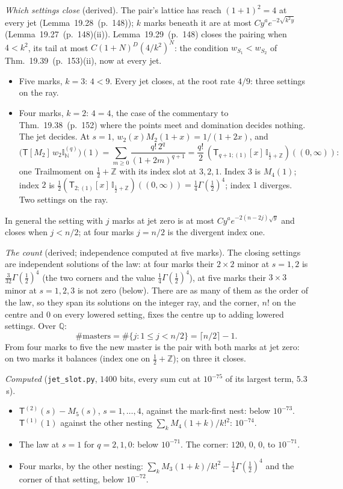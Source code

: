 \documentclass[11pt]{article}
\newcommand{\sT}{\mathsf T}
\newcommand{\Ilat}[1]{\mathbb I_{#1}}
\newcommand{\Tx}[3]{(\sT_{#1;(1)}[x]\,#2)((#3,\infty))}
\newcommand{\hb}[2]{#1~(p.~#2)}   %
\theoremstyle{plain}
\theoremstyle{remark}
\begin{document}
\emph{Which settings close} (derived). The pair's lattice has reach $(1+1)^2=4$ at every jet (Lemma~\hb{19.28}{148}); $k$ marks beneath it are at most $Cy^ae^{-2\sqrt{k^2y}}$ (Lemma~\hb{19.27}{148}(ii)). Lemma~\hb{19.29}{148} closes the pairing when $4<k^2$, its tail at most $C(1+N)^D(4/k^2)^N$: the condition $w_{S_1}<w_{S_2}$ of Thm.~\hb{19.39}{153}(ii), now at every jet.
\begin{itemize}
\item Five marks, $k=3$: $4<9$. Every jet closes, at the root rate $4/9$: three settings on the ray.
\item Four marks, $k=2$: $4=4$, the case of the commentary to Thm.~\hb{19.38}{152} where the points meet and domination decides nothing. The jet decides. At $s=1$, $w_2(x)M_2(1+x)=1/(1+2x)$, and
\[
\big(\sT[M_2]\,w_2\mathbb I^{(q)}_{\mathbb N}\big)(1)=\sum_{m\ge0}\frac{q!\,2^q}{(1+2m)^{q+1}}=\frac{q!}2\,\Tx{q+1}{\Ilat{\frac12+\mathbb Z}}0 :
\]
one Trailmoment on $\frac12+\mathbb Z$ with its index slot at $3,2,1$. Index $3$ is $M_4(1)$; index $2$ is $\frac12\Tx2{\Ilat{\frac12+\mathbb Z}}0=\frac14\Gamma(\frac12)^4$; index $1$ diverges. Two settings on the ray.
\end{itemize}
In general the setting with $j$ marks at jet zero is at most $Cy^ae^{-2(n-2j)\sqrt y}$ and closes when $j<n/2$; at four marks $j=n/2$ is the divergent index one.

\emph{The count} (derived; independence computed at five marks). The closing settings are independent solutions of the law: at four marks their $2\times2$ minor at $s=1,2$ is $\frac3{32}\Gamma(\frac12)^4$ (the two corners and the value $\frac14\Gamma(\frac12)^4$), at five marks their $3\times3$ minor at $s=1,2,3$ is not zero (below). There are as many of them as the order of the law, so they span its solutions on the integer ray, and the corner, $n!$ on the centre and $0$ on every lowered setting, fixes the centre up to adding lowered settings. Over $\mathbb Q$:
\[
\#\text{masters}=\#\{j:1\le j<n/2\}=\lceil n/2\rceil-1 .
\]
From four marks to five the new master is the pair with both marks at jet zero: on two marks it balances (index one on $\frac12+\mathbb Z$); on three it closes.

\emph{Computed} (\texttt{jet\_slot.py}, $1400$ bits, every sum cut at $10^{-75}$ of its largest term, $5.3$\,s).
\begin{itemize}
\item $\sT^{(2)}(s)-M_5(s)$, $s=1,\dots,4$, against the mark-first nest: below $10^{-73}$. $\sT^{(1)}(1)$ against the other nesting $\sum_kM_4(1+k)/k!^2$: $10^{-74}$.
\item The law at $s=1$ for $q=2,1,0$: below $10^{-71}$. The corner: $120$, $0$, $0$, to $10^{-71}$.
\item Four marks, by the other nesting: $\sum_kM_3(1+k)/k!^2-\frac14\Gamma(\frac12)^4$ and the corner of that setting, below $10^{-72}$.
\end{itemize}
\end{document}
